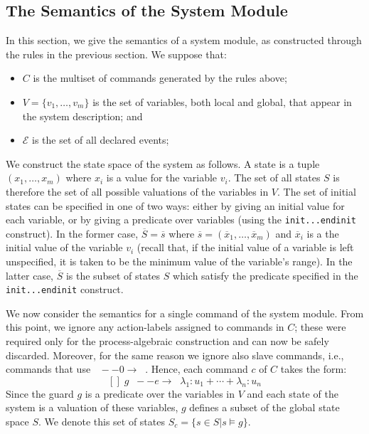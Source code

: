 \documentclass{article}
\newcommand{\arc}[1]{\;\;--{#1}\longrightarrow \;\;}
\newcommand{\calE}{\mathcal{E}}
\renewcommand{\_}{\underline{~}}
\newcommand{\events}{{\calE}}
\newcommand{\code}[1]{\texttt{#1}}
\begin{document}
\subsection*{The Semantics of the System Module}
In this section, we give the semantics of a system module, as constructed through the rules
in the previous section. 
We suppose that:
\begin{itemize}
	\item $C$ is the multiset of commands generated by the rules above;
	\item $V = \{v_1, \ldots , v_m\}$ is the set of variables, both local and global, that appear in the system description; and
	\item $\events$ is the set of all declared events;
\end{itemize}

We construct the state space of the system as follows. 
A state is a tuple $(x_1, \ldots , x_m)$ where $x_i$ is a value for the variable $v_i$. 
The set of all states $S$ is therefore the set of all possible valuations of the variables in $V$. 
The set of initial states can be specified in one of two ways: either by giving an initial value for each variable, or by giving a predicate over variables (using the \code{init...endinit} construct). 
In the former case, $\overline{S} = \overline{s}$ where $\overline{s} = (\overline{x}_1, \ldots , \overline{x}_m)$ and $\overline{x}_i$ is a the initial value of the variable $v_i$ (recall that, if the initial value of a variable is left unspecified, it is taken to be the minimum value of the variable’s range). 
In the latter case, $\overline{S}$ is the subset of states $S$ which satisfy the
predicate specified in the \code{init...endinit} construct.

We now consider the semantics for a single command of the system module. 
From this point, we ignore any action-labels assigned to commands in $C$; these were required only for the process-algebraic construction and can now be safely discarded.
Moreover, for the same reason we ignore also slave commands, i.e., commands that use $\arc{0}$. 
Hence, each command $c$ of $C$ takes the form:
$$[] \; g \arc{e}   \lambda_1 : u_1 + \cdots + \lambda_n : u_n$$
%
Since the guard $g$ is a predicate over the variables in $V$ and each state of the system is a valuation of these variables, $g$ defines a subset of the global state space $S$. 
We denote this set of states $S_c = \{s \in S | s \models g\}$.
\end{document}
